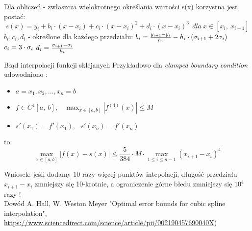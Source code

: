     \begin{frame}
    
        	Dla obliczeń - zwłaszcza wielokrotnego określania wartości s(x) 
            korzystna jest postać:
            \[
            	s(x)=y_{i}+b_{i}\cdot(x-x_{i})+c_{i}
                \cdot(x-x_{i})^{2}+d_{i}\cdot(x-x_{i})^{3}
                \ \ dla \ x\in[x_{i},\ x_{i+1}]
            \]
            $b_{i}, c_{i}, d_{i}$ - określone dla każdego przedziału:
            $b_{i}=\frac{y_{i+1}-y_{i}}{h_{i}}-h_{i}\cdot (\sigma_{i+1}
            +2\sigma_{i})\newline$
            $c_{i}=3\cdot \sigma_{i}\newline$
            $d_{i}=\frac{\sigma_{i+1}-\sigma_{i}}{h_{i}}\newline$

        
    \end{frame}
    \begin{frame}{Błąd interpolacji funkcji sklejanych}
    	Przykładowo dla {\it clamped boundary condition} udowodniono :
        \begin{itemize}
        \item $a=x_{1}, x_{2}, . . . , x_{n}=b$
        \item $f\in C^{4}[a,\ b] , \ \ \ \ \max_{x\in[a,b]}|f^{(4)}
        (x)|\leq M$
        \item $s'(x_{1})=f'(x_{1}), \ \ \ s'(x_{n})=f'(x_{n})$
        \end{itemize}
        to:
        \[
        	\max_{x\in[a,b]}|f(x)-s(x)|\leq \frac{5}{384} \cdot
            M \cdot \max_{1 \leq i \leq n-1}(x_{i+1}-x_{i})^{4}
        \]
        
        Wniosek:  jeśli dodamy 10 razy więcej punktów intepolacji, długość przedziału 
        $x_{i+1}-x_{i}$ zmniejszy się 10-krotnie, a ograniczenie górne błedu zmniejszy się $10^4$ razy !\\
        \small{
        Dowód A. Hall, W. Weston Meyer "Optimal error bounds for cubic spline interpolation",  \url{https://www.sciencedirect.com/science/article/pii/002190457690040X})}
    \end{frame}
    
    
    
    
    
    
    
    
    
    
    
    
    
    
    
    
    
    
    
    
    
    

    
    
    
    
    
    
    
    
    
    
    
    
    
    
    
    
    
    
    